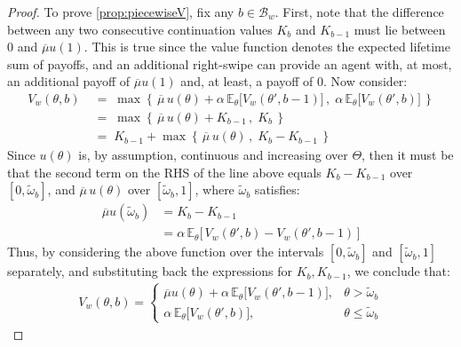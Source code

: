 \begin{proof}
    To prove \autoref{prop:piecewiseV}, fix any $b\in\mathcal{B}_w$. 
    First, note that the difference between any two consecutive continuation values $K_b$ and $K_{b-1}$ must lie between 0 and $\overline{\mu}u(1)$. 
    This is true since the value function denotes the expected lifetime sum of payoffs, and an additional right-swipe can provide an agent with, at most, an additional payoff of $\overline{\mu}u(1)$ and, at least, a payoff of $0$. Now consider:
    \begin{equation*}
        \begin{aligned} 
            V_w(\theta,b) \;&=\;\max\left\{\,\overline{\mu} \, u(\theta) +\alpha \,\mathbb{E}_\theta \Big[V_w(\theta', b-1)\Big]\,,\; \alpha\,\mathbb{E}_\theta \Big[ V_w(\theta', b)\Big]\,\right\}\\
            &=\; \max\left\{\,\overline{\mu} \, u(\theta) + K_{b-1} \,,\; K_b \,\right\}\\
            &=\; K_{b-1} + \max\left\{\,\overline{\mu} \, u(\theta) \,,\; K_b - K_{b-1}\,\right\}
        \end{aligned}
    \end{equation*}
    Since $u(\theta)$ is, by assumption, continuous and increasing over $\Theta$, then it must be that the second term on the RHS of the line above equals $K_b - K_{b-1}$ over $[0, \widetilde\omega_b]$, and $\overline{\mu} \, u(\theta)$ over $[\widetilde\omega_b, 1]$, where $\widetilde\omega_b$ satisfies: 
    \begin{equation*}
        \begin{aligned} 
            \overline\mu u(\widetilde\omega_b) &= K_b-K_{b-1} \\
            &=\alpha \, \mathbb{E}_\theta\Big[\,V_w(\theta',b)-V_w(\theta',b-1)\,\Big]
        \end{aligned} 
    \end{equation*}
    Thus, by considering the above function over the intervals $[0, \widetilde\omega_b]$ and $[\widetilde\omega_b, 1]$ separately, and substituting back the expressions for $K_b, K_{b-1}$, we conclude that:
    \begin{equation*}
    \begin{split}
        V_w(\theta,b)=\begin{cases}
            \overline\mu u(\theta) +\alpha \,\mathbb{E}_{\theta}\Big[V_w(\theta', b-1)\Big],& \theta> \widetilde \omega_b \\[10pt]
            \alpha \,\mathbb{E}_{\theta}\Big[V_w(\theta', b)\Big],& \theta\leq\widetilde \omega_b
        \end{cases} 
    \end{split}
    \end{equation*} 


\end{proof}
